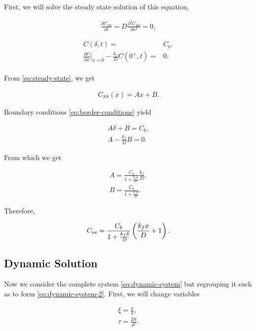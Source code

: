 	First, we will solve the steady state solution of this equation,
	
	\begin{align}
		\frac{\partial C_{SS}}{\partial t} = D \frac{\partial^2 C_{SS}}{\partial x^2} = 0,
		\label{eq:steady-state}
	\end{align}
	
	\begin{align}
		C(\delta, t) =& C_b,\\
		\frac{\partial C}{\partial x}\big|_{x=0} -\frac{k_f}{D}C(0^+,t) =& 0.\\
		\label{eq:border-conditions}
	\end{align}
	
	From \ref{eq:steady-state}, we get
	
	\begin{align}
		C_{SS}(x) = A x + B.
	\end{align}


Boundary conditions \ref{eq:border-conditions} yield

\begin{align}
	A\delta + B = C_b,\\
	A-\frac{k_f}{D} B = 0.
\end{align}

From which we get

\begin{align}
	A = \frac{C_b}{1+\frac{k_f\delta}{D}}\frac{k_f}{D},\\
	B = \frac{C_b}{1+\frac{k_f\delta}{D}}.
\end{align}

Therefore,

\begin{align}
	C_{ss} = \frac{C_b}{1+\frac{k_f\delta}{D}} \left({\frac{k_fx}{D} + 1}\right).
	\label{eq:steady-state-sol}
\end{align}


\subsection{Dynamic Solution}

Now we consider the complete system \ref{eq:dynamic-system} but regrouping it such as to form \ref{eq:dynamic-system-2}. First, we will change variables

\begin{align}
	\xi = \frac{x}{\delta},\\
	\tau = \frac{D t}{\delta^2}.
\end{align}

